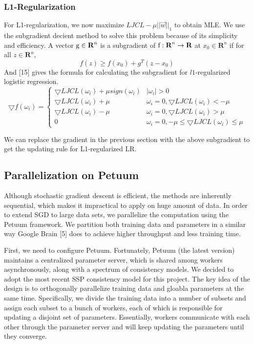 \documentclass{article} %
\begin{document}
\subsubsection{L1-Regularization}
For L1-regularization, we now maximize $LJCL - \mu ||\vec{w}||_1$ to obtain MLE.
We use the subgradient decient method to solve this problem because of its simplicity and efficiency. A vector $\textup{g} \in \textbf{R}^n$ is a subgradient of $\textup{f}:\textbf{R}^n \rightarrow \textbf{R}$ at $x_0 \in \textbf{R}^n$ if for all $z \in \textbf{R}^n$,
\begin{equation}
f(z) \ge f(x_0) + g^T(z-x_0)
\end{equation}
And [15] gives the formula for calculating the subgradient for $l1$-regularized logistic regression.
\begin{equation}
\bigtriangledown f(\omega_i) = \left\{\begin{matrix}
\bigtriangledown LJCL(\omega_i) + \mu sign(\omega_i) & |\omega_i| > 0\\ 
\bigtriangledown LJCL(\omega_i) + \mu & \omega_i=0,\bigtriangledown LJCL(\omega_i)<-\mu\\ 
\bigtriangledown LJCL(\omega_i) - \mu & \omega_i=0,\bigtriangledown LJCL(\omega_i)>\mu\\ 
0 & \omega_i=0, -\mu \le \bigtriangledown LJCL(\omega_i) \le \mu
\end{matrix}\right.
\end{equation}

We can replace the gradient in the previous section with the above subgradient to get the updating rule for L1-regularized LR.

\subsection{Parallelization on Petuum}
Although stochastic gradient descent is efficient, the methods are inherently sequential, which makes it impractical to apply on huge amount of data. In order to extend SGD to large data sets, we parallelize the computation using the Petuum framework. We partition both training data and parameters in a similar way Google Brain [5] does to achieve higher throughput and less training time.

First, we need to configure Petuum. Fortunately, Petuum (the latest version) maintains a centralized parameter server, which is shared among workers asynchronously, along with a spectrum of consistency models. We decided to adopt the most recent SSP consistency model for this project. The key idea of the design is to orthogonally parallelize training data and gloabla parameters at the same time. Specifically, we divide the training data into a number of subsets and assign each subset to a bunch of workers, each of which is responsible for updating a disjoint set of parameters. Essentially, workers communicate with each other through the parameter server and will keep updating the parameters until they converge.
\end{document}
